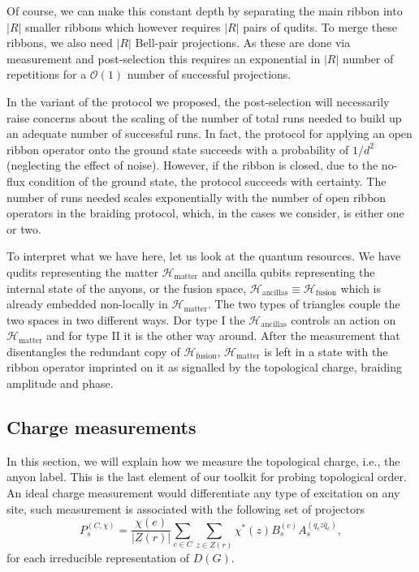 \documentclass[a4paper,twocolumn,11pt]{quantumarticle}
\begin{document}
Of course, we can make this constant depth by separating the main ribbon into $|R|$ smaller ribbons which however requires $|R|$ pairs of qudits. To merge these ribbons, we also need $|R|$ Bell-pair projections. As these are done via measurement and post-selection this requires an exponential in $|R|$ number of repetitions for a $\mathcal{O}(1)$ number of successful projections.

In the variant of the protocol we proposed, the post-selection will necessarily raise concerns about the scaling of the number of total runs needed to build up an adequate number of successful runs. In fact, the protocol for applying an open ribbon operator onto the ground state succeeds with a probability of $1/d^2$ (neglecting the effect of noise). However, if the ribbon is closed, due to the no-flux condition of the ground state, the protocol succeeds with certainty. The number of runs needed scales exponentially with the number of open ribbon operators in the braiding protocol, which, in the cases we consider, is either one or two. 

To interpret what we have here, let us look at the quantum resources. We have qudits representing the matter $\mathcal{H}_{\text{matter}}$ and ancilla qubits representing the internal state of the anyons, or the fusion space, $\mathcal{H}_{\text{ancillas}} \equiv \mathcal{H}_{\text{fusion}}$ which is already embedded non-locally in  $\mathcal{H}_{\text{matter}}$. The two types of triangles couple the two spaces in two different ways. Dor type I the $\mathcal{H}_{\text{ancillas}}$ controls an action on $\mathcal{H}_{\text{matter}}$ and for type II it is the other way around. After the measurement that disentangles the redundant copy of $\mathcal{H}_{\text{fusion}}$, $\mathcal{H}_{\text{matter}}$ is left in a state with the ribbon operator imprinted on it as signalled by the topological charge, braiding amplitude and phase.


\subsection{Charge measurements}\label{sec:redchmmt}

In this section, we will explain how we measure the topological charge, i.e., the anyon label. This is the last element of our toolkit for probing topological order. An ideal charge measurement would differentiate any type of excitation on any site, such measurement is associated with the following set of projectors ~\cite{cui2018topological}
\begin{equation}
    P_s^{(C, \chi)} = \frac{\chi(e)}{|Z(r)|}\sum_{c \in C}\sum_{z \in Z(r)}\chi^*(z)B_s^{(c)}A_s^{(q_c z \bar{q}_c)},
\end{equation}
for each irreducible representation of $D(G)$.
\end{document}
